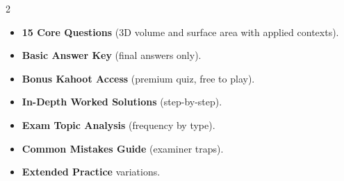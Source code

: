 \documentclass[11pt,a4paper]{article}
\newcommand{\FullReleaseDate}{April 30, 2026}
\begin{document}
\vspace{8pt}

\begin{multicols}{2}
  \begin{tcolorbox}[card, title=\sffamily\bfseries\textcolor{white}{\faHandPointDown\ TODAY (Simplified Version)}, colbacktitle=mainblue, boxed title style={sharp corners, boxrule=0pt}]
    \begin{itemize}[leftmargin=1.2em, itemsep=2pt]
      \item \small \textbf{15 Core Questions} (3D volume and surface area with applied contexts).
      \item \small \textbf{Basic Answer Key} (final answers only).
      \item \small \textbf{Bonus Kahoot Access} (premium quiz, free to play).
    \end{itemize}
  \end{tcolorbox}

  \columnbreak

  \begin{tcolorbox}[card, title=\sffamily\bfseries\textcolor{white}{\faRocket\ ON \FullReleaseDate\ (Full Upgrade)}, colbacktitle=mainblue, boxed title style={sharp corners, boxrule=0pt}]
    \begin{itemize}[leftmargin=1.2em, itemsep=2pt]
      \item \small \textbf{In-Depth Worked Solutions} (step-by-step).
      \item \small \textbf{Exam Topic Analysis} (frequency by type).
      \item \small \textbf{Common Mistakes Guide} (examiner traps).
      \item \small \textbf{Extended Practice} variations.
    \end{itemize}
  \end{tcolorbox}
\end{multicols}
\end{document}
